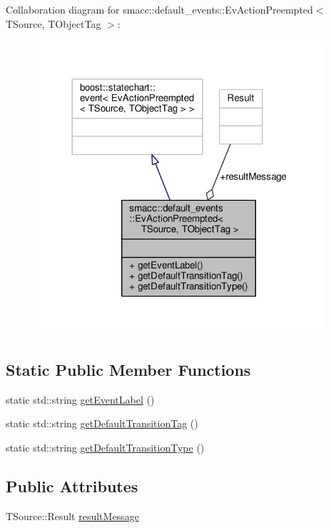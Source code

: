 Collaboration diagram for smacc\+:\+:default\+\_\+events\+:\+:Ev\+Action\+Preempted$<$ T\+Source, T\+Object\+Tag $>$\+:\nopagebreak
\begin{figure}[H]
\begin{center}
\leavevmode
\includegraphics[width=306pt]{structsmacc_1_1default__events_1_1EvActionPreempted__coll__graph}
\end{center}
\end{figure}
\subsection*{Static Public Member Functions}
\begin{DoxyCompactItemize}
\item 
static std\+::string \hyperlink{structsmacc_1_1default__events_1_1EvActionPreempted_ae872ff61b26c07446358f41be00c8f59}{get\+Event\+Label} ()
\item 
static std\+::string \hyperlink{structsmacc_1_1default__events_1_1EvActionPreempted_a71e953e6cd08d825c85ffca7819a0145}{get\+Default\+Transition\+Tag} ()
\item 
static std\+::string \hyperlink{structsmacc_1_1default__events_1_1EvActionPreempted_a29edbbf19a68ab8930f2f3664c45c9e7}{get\+Default\+Transition\+Type} ()
\end{DoxyCompactItemize}
\subsection*{Public Attributes}
\begin{DoxyCompactItemize}
\item 
T\+Source\+::\+Result \hyperlink{structsmacc_1_1default__events_1_1EvActionPreempted_a38f3c09c9c672b82b08ea5ff2085280e}{result\+Message}
\end{DoxyCompactItemize}


